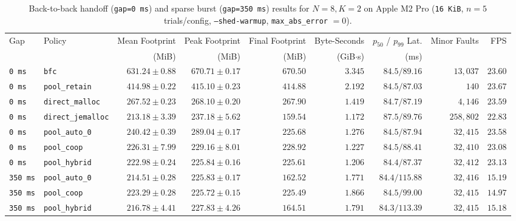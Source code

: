 \documentclass[sigconf,screen]{acmart}
\begin{document}
\begin{table}[t]
  \centering
  \caption{Back-to-back handoff (\texttt{gap=0~ms}) and sparse burst (\texttt{gap=350~ms}) results for $N=8, K=2$ on Apple M2 Pro (\texttt{16~KiB}, $n=5$ trials/config, \texttt{--shed-warmup}, \texttt{max\_abs\_error} $= 0$).}
  \label{tab:handoff}
  \small
  \begin{tabular}{llrrrrrrr}
    \toprule
    Gap & Policy & Mean Footprint & Peak Footprint & Final Footprint & Byte-Seconds & $p_{50}$ / $p_{99}$ Lat. & Minor Faults & FPS \\
        &        & (MiB)          & (MiB)          & (MiB)           & (GiB$\cdot$s) & (ms) & & \\
    \midrule
    \texttt{0~ms} & \texttt{bfc}             & $631.24 \pm 0.88$ & $670.71 \pm 0.17$ & $670.50$ & $3.345$ & $84.5 / 89.16$ & $13{,}037$  & $23.60$ \\
    \texttt{0~ms} & \texttt{pool\_retain}    & $414.98 \pm 0.22$ & $415.10 \pm 0.23$ & $414.88$ & $2.192$ & $84.5 / 87.03$ & $140$       & $23.67$ \\
    \texttt{0~ms} & \texttt{direct\_malloc}  & $267.52 \pm 0.23$ & $268.10 \pm 0.20$ & $267.90$ & $1.419$ & $84.7 / 87.19$ & $4{,}146$   & $23.59$ \\
    \texttt{0~ms} & \texttt{direct\_jemalloc}& $213.18 \pm 3.39$ & $237.18 \pm 5.62$ & $159.54$ & $1.172$ & $87.5 / 89.76$ & $258{,}802$ & $22.83$ \\
    \texttt{0~ms} & \texttt{pool\_auto\_0}   & $240.42 \pm 0.39$ & $289.04 \pm 0.17$ & $225.68$ & $1.276$ & $84.5 / 87.94$ & $32{,}415$  & $23.58$ \\
    \texttt{0~ms} & \texttt{pool\_coop}      & $226.31 \pm 7.99$ & $229.16 \pm 8.01$ & $228.92$ & $1.227$ & $84.5 / 88.41$ & $32{,}410$  & $23.08$ \\
    \texttt{0~ms} & \texttt{pool\_hybrid}    & $222.98 \pm 0.24$ & $225.84 \pm 0.16$ & $225.61$ & $1.206$ & $84.4 / 87.37$ & $32{,}412$  & $23.13$ \\
    \midrule
    \texttt{350~ms} & \texttt{pool\_auto\_0} & $214.51 \pm 0.28$ & $225.83 \pm 0.17$ & $162.52$ & $1.771$ & $84.4 / 115.88$ & $32{,}416$ & $15.19$ \\
    \texttt{350~ms} & \texttt{pool\_coop}    & $223.29 \pm 0.28$ & $225.72 \pm 0.15$ & $225.49$ & $1.866$ & $84.5 / 99.00$  & $32{,}415$ & $14.97$ \\
    \texttt{350~ms} & \texttt{pool\_hybrid}  & $216.78 \pm 4.41$ & $227.83 \pm 4.26$ & $164.51$ & $1.791$ & $84.3 / 113.39$ & $32{,}415$ & $15.18$ \\
    \bottomrule
  \end{tabular}
\end{table}
\end{document}
